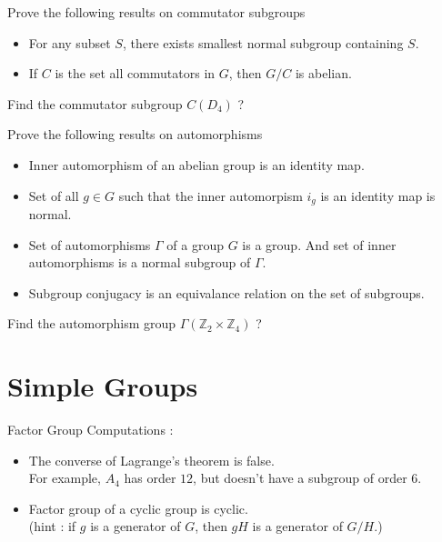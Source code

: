\begin{remark}Prove the following results on commutator subgroups 
	\begin{itemize}
		\item For any subset $S$, there exists smallest normal subgroup containing $S$.%
		\item If $C$ is the set all commutators in $G$, then $G/C$ is abelian.%
	\end{itemize}
\end{remark}
\begin{question}
	Find the commutator subgroup $C(D_4)$ ?
\end{question}

\begin{remark}Prove the following results on automorphisms 
	\begin{itemize}
		\item Inner automorphism of an abelian group is an identity map.%
		\item Set of all $g \in G$ such that the inner automorpism $i_g$ is an identity map is normal.%
		\item Set of automorphisms $\Gamma$ of a group $G$ is a group.
			And set of inner automorphisms is a normal subgroup of $\Gamma$.
		\item Subgroup conjugacy is an equivalance relation on the set of subgroups.%
	\end{itemize}
\end{remark}
\begin{question}
	Find the automorphism group $\Gamma(\mathbb{Z}_2 \times \mathbb{Z}_4)$ ?
\end{question}

\section{Simple Groups}
\begin{remark}Factor Group Computations :
	\begin{itemize}
		\item The converse of Lagrange's theorem is false.\\
			For example, $A_4$ has order $12$, but doesn't have a subgroup of order $6$.
		\item Factor group of a cyclic group is cyclic.\\
			(hint : if $g$ is a generator of $G$, then $gH$ is a generator of $G/H$.)
	\end{itemize}
\end{remark}

